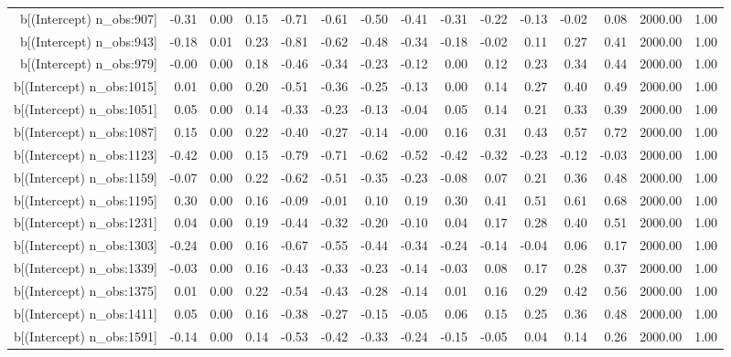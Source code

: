 \begin{table}[ht]
\begin{tabular}{rrrrrrrrrrrrrrr}
  b[(Intercept) n\_obs:907] & -0.31 & 0.00 & 0.15 & -0.71 & -0.61 & -0.50 & -0.41 & -0.31 & -0.22 & -0.13 & -0.02 & 0.08 & 2000.00 & 1.00 \\ 
  b[(Intercept) n\_obs:943] & -0.18 & 0.01 & 0.23 & -0.81 & -0.62 & -0.48 & -0.34 & -0.18 & -0.02 & 0.11 & 0.27 & 0.41 & 2000.00 & 1.00 \\ 
  b[(Intercept) n\_obs:979] & -0.00 & 0.00 & 0.18 & -0.46 & -0.34 & -0.23 & -0.12 & 0.00 & 0.12 & 0.23 & 0.34 & 0.44 & 2000.00 & 1.00 \\ 
  b[(Intercept) n\_obs:1015] & 0.01 & 0.00 & 0.20 & -0.51 & -0.36 & -0.25 & -0.13 & 0.00 & 0.14 & 0.27 & 0.40 & 0.49 & 2000.00 & 1.00 \\ 
  b[(Intercept) n\_obs:1051] & 0.05 & 0.00 & 0.14 & -0.33 & -0.23 & -0.13 & -0.04 & 0.05 & 0.14 & 0.21 & 0.33 & 0.39 & 2000.00 & 1.00 \\ 
  b[(Intercept) n\_obs:1087] & 0.15 & 0.00 & 0.22 & -0.40 & -0.27 & -0.14 & -0.00 & 0.16 & 0.31 & 0.43 & 0.57 & 0.72 & 2000.00 & 1.00 \\ 
  b[(Intercept) n\_obs:1123] & -0.42 & 0.00 & 0.15 & -0.79 & -0.71 & -0.62 & -0.52 & -0.42 & -0.32 & -0.23 & -0.12 & -0.03 & 2000.00 & 1.00 \\ 
  b[(Intercept) n\_obs:1159] & -0.07 & 0.00 & 0.22 & -0.62 & -0.51 & -0.35 & -0.23 & -0.08 & 0.07 & 0.21 & 0.36 & 0.48 & 2000.00 & 1.00 \\ 
  b[(Intercept) n\_obs:1195] & 0.30 & 0.00 & 0.16 & -0.09 & -0.01 & 0.10 & 0.19 & 0.30 & 0.41 & 0.51 & 0.61 & 0.68 & 2000.00 & 1.00 \\ 
  b[(Intercept) n\_obs:1231] & 0.04 & 0.00 & 0.19 & -0.44 & -0.32 & -0.20 & -0.10 & 0.04 & 0.17 & 0.28 & 0.40 & 0.51 & 2000.00 & 1.00 \\ 
  b[(Intercept) n\_obs:1303] & -0.24 & 0.00 & 0.16 & -0.67 & -0.55 & -0.44 & -0.34 & -0.24 & -0.14 & -0.04 & 0.06 & 0.17 & 2000.00 & 1.00 \\ 
  b[(Intercept) n\_obs:1339] & -0.03 & 0.00 & 0.16 & -0.43 & -0.33 & -0.23 & -0.14 & -0.03 & 0.08 & 0.17 & 0.28 & 0.37 & 2000.00 & 1.00 \\ 
  b[(Intercept) n\_obs:1375] & 0.01 & 0.00 & 0.22 & -0.54 & -0.43 & -0.28 & -0.14 & 0.01 & 0.16 & 0.29 & 0.42 & 0.56 & 2000.00 & 1.00 \\ 
  b[(Intercept) n\_obs:1411] & 0.05 & 0.00 & 0.16 & -0.38 & -0.27 & -0.15 & -0.05 & 0.06 & 0.15 & 0.25 & 0.36 & 0.48 & 2000.00 & 1.00 \\ 
  b[(Intercept) n\_obs:1591] & -0.14 & 0.00 & 0.14 & -0.53 & -0.42 & -0.33 & -0.24 & -0.15 & -0.05 & 0.04 & 0.14 & 0.26 & 2000.00 & 1.00 \\ 

\end{tabular}
\end{table}

